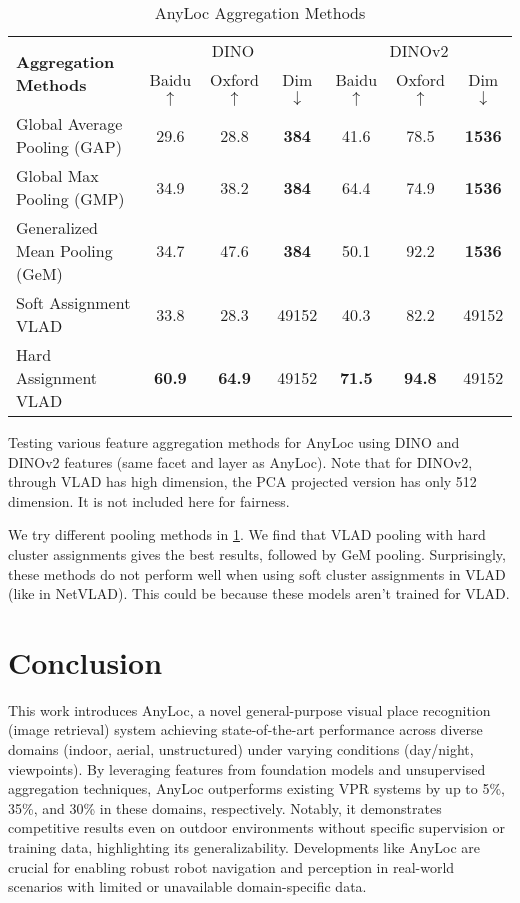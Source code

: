 \begin{table}
    \centering
    \begin{tabular}{|l|ccc|ccc|}
        \hline
        \multirow{2}{*}{\textbf{Aggregation Methods}} & 
            \multicolumn{3}{c|}{DINO} & \multicolumn{3}{c|}{DINOv2} \\
        & {\color{IndoorDark} Baidu $\uparrow$} & 
        {\color{OutdoorDark} Oxford $\uparrow$} & Dim $\downarrow$ & 
            {\color{IndoorDark} Baidu $\uparrow$} & 
        {\color{OutdoorDark} Oxford $\uparrow$} & Dim $\downarrow$ \\
        \hline
        Global Average Pooling (GAP) & 29.6 & 28.8 & \textbf{384} & 
            41.6 & 78.5 & \textbf{1536} \\
        Global Max Pooling (GMP) & 34.9 & 38.2 & \textbf{384} & 64.4 &
            74.9 & \textbf{1536} \\
        Generalized Mean Pooling (GeM) & 34.7 & 47.6 & \textbf{384} &
            50.1 & 92.2 & \textbf{1536} \\
        Soft Assignment VLAD & 33.8 & 28.3 & 49152 & 40.3 & 82.2 &
            49152 \\
        Hard Assignment VLAD & \textbf{60.9} & \textbf{64.9} & 49152 &
            \textbf{71.5} & \textbf{94.8} & 49152 \\
        \hline
    \end{tabular}
    \caption{AnyLoc Aggregation Methods}
    \small
        Testing various feature aggregation methods for AnyLoc using
        DINO and DINOv2 features (same facet and layer as AnyLoc).
        Note that for DINOv2, through VLAD has high dimension, the PCA
        projected version has only 512 dimension. It is not included
        here for fairness.
    \label{tab:anyloc_agg_ablation}
\end{table}

We try different pooling methods in \cref{tab:anyloc_agg_ablation}. We
find that VLAD pooling with hard cluster assignments gives the best
results, followed by GeM pooling. Surprisingly, these methods do not
perform well when using soft cluster assignments in VLAD (like in
NetVLAD). This could be because these models aren't trained for VLAD.

\section{Conclusion}

This work introduces AnyLoc, a novel general-purpose visual place
recognition (image retrieval) system achieving state-of-the-art
performance across diverse domains (indoor, aerial, unstructured)
under varying conditions (day/night, viewpoints). By leveraging
features from foundation models and unsupervised aggregation
techniques, AnyLoc outperforms existing VPR systems by up to 5\%, 35\%,
and 30\% in these domains, respectively. Notably, it demonstrates
competitive results even on outdoor environments without specific
supervision or training data, highlighting its generalizability.
Developments like AnyLoc are crucial for enabling robust robot
navigation and perception in real-world scenarios with limited or
unavailable domain-specific data.
